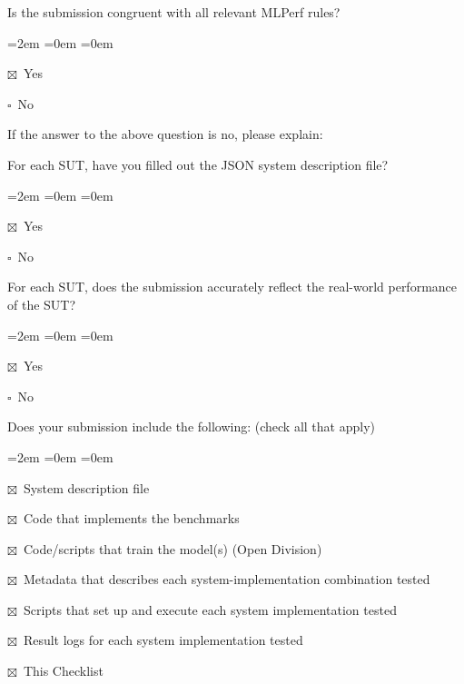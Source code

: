 \documentclass[11pt]{article}
\newcommand{\cb}{$\square$~}            %
\newcommand{\cbx}{$\boxtimes$~}         %
\begin{document}
Is the submission congruent with all relevant MLPerf rules?
\begin{list}{}{\leftmargin=2em \itemsep=0em \topsep=0em}
\item \cbx Yes
\item \cb  No
\end{list}

If the answer to the above question is no, please explain:

\vspace{2em}

For each SUT, have you filled out the JSON system description file?
\begin{list}{}{\leftmargin=2em \itemsep=0em \topsep=0em}
\item \cbx Yes
\item \cb  No
\end{list}

For each SUT, does the submission accurately reflect the real-world
performance of the SUT?
\begin{list}{}{\leftmargin=2em \itemsep=0em \topsep=0em}
\item \cbx Yes
\item \cb  No
\end{list}

Does your submission include the following: (check all that apply)
\begin{list}{}{\leftmargin=2em \itemsep=0em \topsep=0em}
\item \cbx System description file
\item \cbx Code that implements the benchmarks
\item \cbx Code/scripts that train the model(s) (Open Division)
\item \cbx Metadata that describes each system-implementation combination tested
\item \cbx Scripts that set up and execute each system implementation tested
\item \cbx Result logs for each system implementation tested
\item \cbx This Checklist
\end{list}
\end{document}
